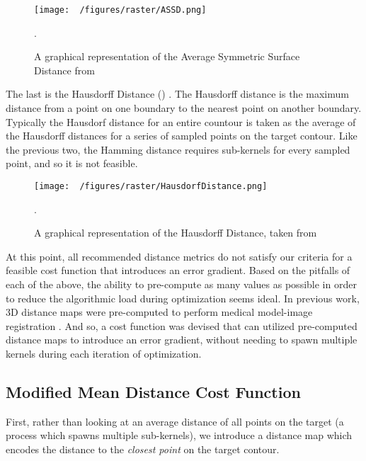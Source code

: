 \begin{figure}[h!]
  \centering
  \texttt{[image: ~/figures/raster/ASSD.png]}
  \caption{A graphical representation of the Average Symmetric Surface Distance from \cite{reinkeUnderstandingMetricrelatedPitfalls2023,reinkeCommonLimitationsImage2023}}.
  \label{fig:ASSD}
\end{figure}

The last is the Hausdorff Distance () \cite{huttenlocherMultiresolutionTechniqueComparing1993,felzenszwalbDistanceTransformsSampled2012,huttenlocherComparingImagesUsing1993}.
The Hausdorff distance is the maximum distance from a point on one boundary to the nearest point on another boundary. Typically the Hausdorf distance for an entire countour is taken as the average of the Hausdorff distances for a series of sampled points on the target contour.
Like the previous two, the Hamming distance requires sub-kernels for every sampled point, and so it is not feasible.


\begin{figure}[h!]
  \centering
  \texttt{[image: ~/figures/raster/HausdorfDistance.png]}
  \caption{A graphical representation of the Hausdorff Distance, taken from \cite{reinkeCommonLimitationsImage2023,reinkeUnderstandingMetricrelatedPitfalls2023}}.
  \label{fig:HD}
\end{figure}

At this point, all recommended distance metrics do not satisfy our criteria for a feasible cost function that introduces an error gradient.
Based on the pitfalls of each of the above, the ability to pre-compute as many values as possible in order to reduce the algorithmic load during optimization seems ideal.
In previous work, 3D distance maps were pre-computed to perform medical model-image registration \cite{lavalleeRecoveringPositionOrientation1995,zuffiModelbasedMethodReconstruction1999}.
And so, a cost function was devised that can utilized pre-computed distance maps to introduce an error gradient, without needing to spawn multiple kernels during each iteration of optimization.

\subsection{Modified Mean Distance Cost Function}
First, rather than looking at an average distance of all points on the target (a process which spawns multiple sub-kernels), we introduce a distance map which encodes the distance to the \emph{closest point} on the target contour.

